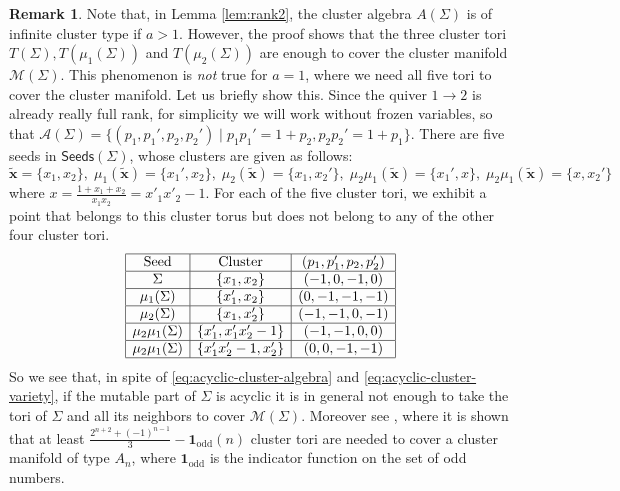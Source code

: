 \documentclass{amsart}
\newcommand{\seed}{\Sigma}
\newcommand{\excluster}[1]{\widetilde{\mathbf{#1}}}
\newcommand{\var}{\mathcal{A}}
\newcommand{\manifold}{\mathcal{M}}
\newcommand{\seeds}{\mathsf{Seeds}}
\numberwithin{equation}{section}
\theoremstyle{definition}
\newtheorem{remark}[theorem]{Remark}
\newcommand{\JS}[1]{\textcolor{teal}{[JS: \footnotesize #1]}}
\newcommand{\cS}[1]{\textcolor{purple}{[SN: \footnotesize $\blacksquare$ #1 $\blacksquare$]}}
\begin{document}
\begin{remark}
        Note that, in Lemma \ref{lem:rank2}, the cluster algebra $A(\seed)$ is of infinite cluster type if $a > 1$. However, the proof shows that the three cluster tori $T(\seed), T(\mu_1(\seed))$ and $T(\mu_2(\seed))$ are enough to cover the cluster manifold $\manifold(\seed)$. This phenomenon is \emph{not} true for $a = 1$, where we need all five tori to cover the cluster manifold. Let us briefly show this. Since the quiver $1 \to 2$ is already really full rank, for simplicity we will work without frozen variables, so that $\var(\seed) = \{(p_1, p_1', p_2, p_2') \mid p_1p_1'= 1 + p_2, p_2p_2' = 1 + p_1\}$. There are five seeds in $\seeds(\seed)$, whose clusters are given as follows:
        \[
        \excluster{x} = \{x_1, x_2\},\; \mu_1(\excluster{x}) = \{x_1', x_2\}, \;\mu_2(\excluster{x}) = \{x_1, x_2'\}, \; \mu_2\mu_1(\excluster{x}) = \{x_1', x\}, \; \mu_2\mu_1(\excluster{x}) = \{x, x_2'\}
        \]
        where $x = \frac{1 + x_1 + x_2}{x_1x_2} = x'_1x'_2 - 1$. For each of the five cluster tori, we exhibit a point that belongs to this cluster torus but does not belong to any of the other four cluster tori.
        \[
        \begin{array}{|c|c|c|}
        \hline 
        \text{Seed} & \text{Cluster} &  (p_1, p_1', p_2, p_2') \\
        \hline
        \seed & \{x_1, x_2\} & (-1, 0, -1, 0) \\
        \hline
        \mu_1(\seed) & \{x_1', x_2\} &  (0, -1, -1, -1) \\
        \hline
        \mu_2(\seed) & \{x_1, x'_2\} &  (-1, -1, 0, -1) \\
        \hline
        \mu_2\mu_1(\seed) & \{x_1', x_1'x_2' - 1\} & (-1, -1, 0, 0) \\
        \hline
        \mu_2\mu_1(\seed) & \{x'_1x'_2 - 1, x'_2\} & (0, 0, -1, -1) \\
        \hline
        \end{array}
        \]
        So we see that, in spite of \eqref{eq:acyclic-cluster-algebra} and \eqref{eq:acyclic-cluster-variety}, if the mutable part of $\seed$ is acyclic 
        it is in general not enough to take the tori of $\seed$ and all its neighbors to cover $\manifold(\seed)$. Moreover see \cite{dani}, where it is shown that at least $\frac{2^{n+2}+(-1)^{n-1}}{3} - \mathbf{1}_{\mathrm{odd}}(n)$ cluster tori are needed to cover a cluster manifold of type $A_n$, where $\mathbf{1}_{\mathrm{odd}}$ is the indicator function on the set of odd numbers. %
\end{remark}
\end{document}

